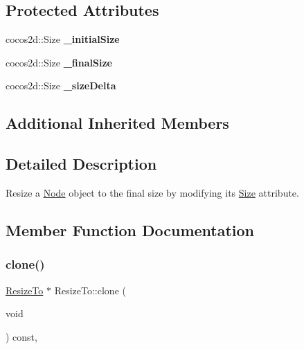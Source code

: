 \subsection*{Protected Attributes}
\begin{DoxyCompactItemize}
\item 
\mbox{\label{classResizeTo_ab48db677a89f95c1125592250c48284c}} 
cocos2d\+::\+Size {\bfseries \+\_\+initial\+Size}
\item 
\mbox{\label{classResizeTo_a3dc7a9cf4ec37ca850b401994f5bc826}} 
cocos2d\+::\+Size {\bfseries \+\_\+final\+Size}
\item 
\mbox{\label{classResizeTo_a0a3bf2998fd1087c63851a11ded8daad}} 
cocos2d\+::\+Size {\bfseries \+\_\+size\+Delta}
\end{DoxyCompactItemize}
\subsection*{Additional Inherited Members}


\subsection{Detailed Description}
Resize a \hyperlink{classNode}{Node} object to the final size by modifying it\textquotesingle{}s \hyperlink{classSize}{Size} attribute. 

\subsection{Member Function Documentation}
\mbox{\label{classResizeTo_a187ae9350810bc93ec2407b29103ac8c}} 
\subsubsection{\texorpdfstring{clone()}{clone()}}
{\footnotesize\ttfamily \hyperlink{classResizeTo}{Resize\+To} $\ast$ Resize\+To\+::clone (\begin{DoxyParamCaption}\item[{void}]{ }\end{DoxyParamCaption}) const\hspace{0.3cm}{\ttfamily [override]}, {\ttfamily [virtual]}}

